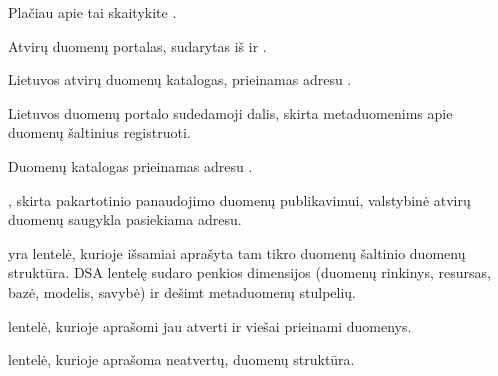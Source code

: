 \documentclass[letterpaper,10pt,lithuanian]{sphinxmanual}
\begin{document}
\begin{description}
\sphinxAtStartPar
Plačiau apie tai skaitykite .

\sphinxAtStartPar
Atvirų duomenų portalas, sudarytas iš {\hyperref[\detokenize{savokos:term-ADK}]{}} ir {\hyperref[\detokenize{savokos:term-ADS}]{}}.

\sphinxAtStartPar
Lietuvos atvirų duomenų katalogas, prieinamas adresu .

\sphinxAtStartPar
Lietuvos duomenų portalo sudedamoji dalis, skirta metaduomenims apie
duomenų šaltinius registruoti.

\sphinxAtStartPar
Duomenų katalogas prieinamas adresu .

\sphinxAtStartPar
{}, skirta pakartotinio
panaudojimo duomenų publikavimui, valstybinė atvirų duomenų saugykla
pasiekiama  adresu.

\sphinxAtStartPar
{} yra
lentelė, kurioje išsamiai aprašyta tam tikro duomenų šaltinio duomenų
struktūra. DSA lentelę sudaro penkios dimensijos (duomenų rinkinys,
resursas, bazė, modelis, savybė) ir dešimt metaduomenų stulpelių.

\sphinxAtStartPar
{\hyperref[\detokenize{savokos:term-DSA}]{}} lentelė, kurioje aprašomi jau atverti ir viešai prieinami
duomenys.

\sphinxAtStartPar
{\hyperref[\detokenize{savokos:term-DSA}]{}} lentelė, kurioje aprašoma neatvertų, {\hyperref[\detokenize{savokos:term-pirminis-duomenu-saltinis}]{}} duomenų struktūra.


\end{description}
\end{document}
